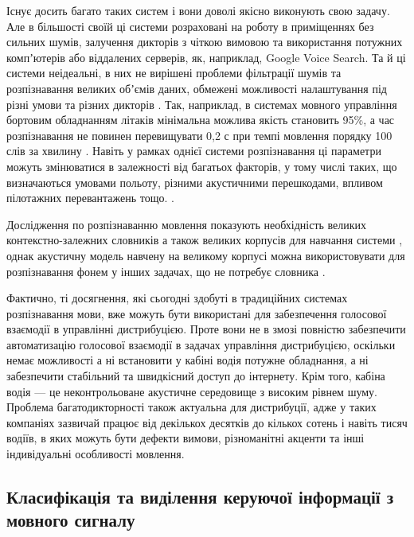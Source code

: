 Існує досить багато таких систем і вони доволі якісно виконують свою задачу. Але в більшості своїй ці системи розраховані на роботу в приміщеннях без сильних шумів, залучення дикторів з чіткою вимовою та використання потужних компʼютерів або віддалених серверів, як, наприклад, Google Voice Search. Та й ці системи неідеальні, в них не вирішені проблеми фільтрації шумів та розпізнавання великих обʼємів даних, обмежені можливості налаштування під різні умови та різних дикторів \cite{Volkov_2014}. Так, наприклад, в системах мовного управління бортовим обладнанням літаків мінімальна можлива якість становить 95\%, а час розпізнавання не повинен перевищувати 0,2 с при темпі мовлення порядку 100 слів за хвилину \cite{Bondaros_2007}. Навіть у рамках однієї системи розпізнавання ці параметри можуть змінюватися в залежності від багатьох факторів, у тому числі таких, що визначаються умовами польоту, різними акустичними перешкодами, впливом пілотажних перевантажень тощо. \cite{Korsun_2013}.

Дослідження по розпізнаванню мовлення показують необхідність великих контекстно-залежних словників а також великих корпусів для навчання системи \cite{Pylypenko_2008,Pylypenko_2009,Pylypenko_2010,Lydovyk_2011,Vasilyeva_2012,Womack_1999,Zirneeva_2008,Gladunov_2005}, однак акустичну модель навчену на великому корпусі можна використовувати для розпізнавання фонем у інших задачах, що не потребує словника \cite{Pylypenko_2008,Robeyko_2012,Abdel_2012,Zhang_2017,Sharma_2018,Yermolenko_2008}. 

Фактично, ті досягнення, які сьогодні здобуті в традиційних системах розпізнавання мови, вже можуть бути використані для забезпечення голосової взаємодії в управлінні дистрибуцією. Проте вони не в змозі повністю забезпечити автоматизацію голосової взаємодії в задачах управління дистрибуцією, оскільки немає можливості а ні встановити у кабіні водія потужне обладнання, а ні забезпечити стабільний та швидкісний доступ до інтернету. Крім того, кабіна водія — це неконтрольоване акустичне середовище з високим рівнем шуму. Проблема багатодикторності також актуальна для дистрибуції, адже у таких компаніях зазвичай працює від декількох десятків до кількох сотень і навіть тисяч водіїв, в яких можуть бути дефекти вимови, різноманітні акценти та інші індивідуальні особливості мовлення.

\subsection{Класифікація та виділення керуючої інформації з мовного сигналу}

